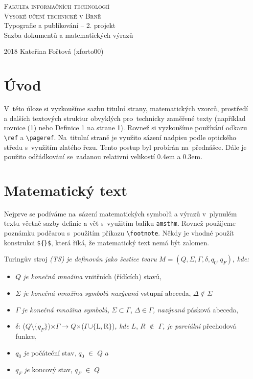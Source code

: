 \documentclass[a4paper, 11pt]{article}
\theoremstyle{definition}
\begin{document}
\begin{titlepage}
\begin{center}
\Huge
\textsc{Fakulta informačních technologií \\ Vysoké učení technické v Brně}\\
Typografie a publikování -- 2. projekt\\ Sazba dokumentů a matematických výrazů\\
\end{center}
{\LARGE 2018 \hfill Kateřina Fořtová (xforto00)}
\end{titlepage}

\begin{twocolumn}
\section*{Úvod}
V~této úloze si vyzkoušíme sazbu titulní strany, matematických
vzorců, prostředí a dalších textových struktur obvyklých
pro~technicky zaměřené texty (například rovnice (1)
nebo Definice 1 na strane 1). Rovnež si vyzkoušíme používání
odkazu \verb|\ref| a \verb|\pageref|.
Na~titulní straně je využito sázení nadpisu podle optického
středu s~využitím zlatého řezu. Tento postup byl
probírán na~přednášce. Dále je použito odřádkování se~zadanou relativní velikostí 0.4em a 0.3em.
\section{Matematický text}
Nejprve se podíváme na~sázení matematických symbolů
a výrazů v~plynulém textu včetně sazby definic a vět s~využitím
balíku \verb|amsthm|. Rovnež použijeme poznámku podčarou s~použitím příkazu \verb|\footnote|. Někdy je vhodné
použít konstrukci \verb|${}$|, která říká, že matematický text
nemá být zalomen.

 Turingův stroj \textit{(TS) je definován jako šestice tvaru} $M = (Q, \Sigma, \Gamma, \delta, q_0, q_F)$\textit{, kde:}
\begin{itemize}
\item{$Q$\textit{ je konečná množina} vnitřních (řídících) stavů,}
\item{$\Sigma$\textit{ je konečná množina symbolů nazývaná }\textmd{vstupní abeceda, }$\Delta\notin\Sigma$}
\item{$\Gamma$\textit{ je konečná množina symbolů, }$\Sigma\subset\Gamma$, $\Delta\in\Gamma$\textit{, nazývaná }\textmd{pásková abeceda,}}
\item{$\delta$: ($Q$$\setminus$$\{$$q_{F}$$\}$)$\times$$\Gamma$$\rightarrow$$Q$$\times$($\Gamma$$\cup$$\{$L$, $R$\}$)\textit{, kde }$L$, $R$ $\notin$ $\Gamma$\textit{, je parciální} přechodová funkce,}
\item{$q_0$ \textit{je} počáteční stav, $q_0$ $\in$ $Q$ $a$}
\item{$q_F$ \textit{je} koncový stav, $q_F$ $\in$ $Q$}
\end{itemize}


\end{twocolumn}
\end{document}
